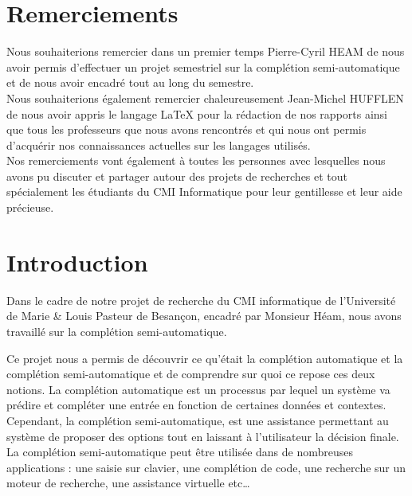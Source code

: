 \documentclass[a4paper, 11pt]{report}
\begin{document}
\chapter*{Remerciements}

Nous souhaiterions remercier dans un premier temps Pierre-Cyril HEAM de nous avoir permis d'effectuer un projet semestriel sur la complétion semi-automatique et de nous avoir encadré tout au long du semestre. \\

Nous souhaiterions également remercier chaleureusement Jean-Michel HUFFLEN de nous avoir appris le langage \LaTeX{} pour la rédaction de nos rapports ainsi que tous les professeurs que nous avons rencontrés et qui nous ont permis d'acquérir nos connaissances actuelles sur les langages utilisés.\\

Nos remerciements vont également à toutes les personnes avec lesquelles nous avons pu discuter et partager autour des projets de recherches et tout spécialement les étudiants du CMI Informatique pour leur gentillesse et leur aide précieuse. \\



\newpage
\tableofcontents
\listoffigures



\chapter*{Introduction} %

Dans le cadre de notre projet de recherche du CMI informatique de l’Université de Marie \& Louis Pasteur de Besançon, encadré par Monsieur Héam, nous avons travaillé sur la complétion semi-automatique.\par \vspace{\baselineskip} %


Ce projet nous a permis de découvrir ce qu'était la complétion automatique et la complétion semi-automatique et de comprendre sur quoi ce repose ces deux notions. La complétion automatique est un processus par lequel un système va prédire et compléter une entrée en fonction de certaines données et contextes. Cependant, la complétion semi-automatique, est une assistance permettant au système de proposer des options tout en laissant à l'utilisateur la décision finale. La complétion semi-automatique peut être utilisée dans de nombreuses applications : une saisie sur clavier, une complétion de code, une recherche sur un moteur de recherche, une assistance virtuelle etc\dots\par \vspace{\baselineskip} %
\end{document}
